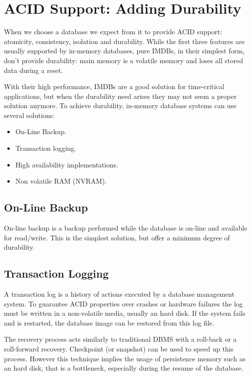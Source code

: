 	\section{ACID Support: Adding Durability}
		When we choose a database we expect from it to provide ACID support: atomicity, consistency, 
		isolation and durability. While the first three features are usually supported by in-memory 
		databases, pure IMDBs, in their simplest form, don't provide durability: 
		main memory is a volatile memory and loses all stored data during a reset. 
		
		With their high performance, IMDBs are a good solution for time-critical 
		applications, but when the durability need arises they may not seem a proper
		solution anymore.	To achieve durability\cite{Gorine}, 
		in-memory database systems can use several solutions:
		
		\begin{itemize}			
			\item On-Line Backup. 
			\item Transaction logging.
			\item High availability implementations.	
			\item Non volatile RAM (NVRAM).
		\end{itemize}	
		
		\subsection{On-Line Backup}
			On-line backup is a backup performed while the database is on-line 
			and available for read/write. This is the simplest solution,
			but offer a minimum degree of durability.
		
		\subsection{Transaction Logging}
			A transaction log is a history of actions executed by a database 
			management system. To guarantee ACID properties over crashes or hardware 
			failures the log must be written in a non-volatile media, usually an hard disk. 
			If the system fails and is restarted, the database image can be restored from 
			this log file. 
			
			The recovery process acts similarly to traditional DBMS with a roll-back 
			or a roll-forward recovery. Checkpoint (or snapshot) can be 
			used to speed up this process. However this technique implies the usage 
			of persistence memory such as an hard disk, that is a bottleneck, 
			especially during the resume of the database.
			
